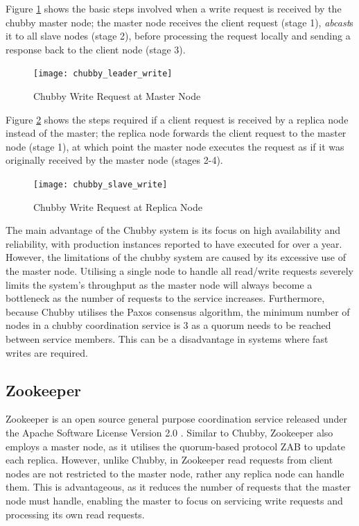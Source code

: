Figure \ref{fig:chubby_leader_write} shows the basic steps involved when a write request is received by the chubby master node; the master node receives the client request (stage 1), \emph{abcast}s it to all slave nodes (stage 2), before processing the request locally and sending a response back to the client node (stage 3).  

	\begin{figure}[htbp!] 
	    \centering    
	    \texttt{[image: chubby\_leader\_write]}
	    \caption[Chubby Write Request at Master Node]{Chubby Write Request at Master Node}
	    \label{fig:chubby_leader_write}
	\end{figure}	 

Figure \ref{fig:chubby_slave_write} shows the steps required if a client request is received by a replica node instead of the master; the replica node forwards the client request to the master node (stage 1), at which point the master node executes the request as if it was originally received by the master node (stages 2-4).

	\begin{figure}[htbp!] 
	    \centering    
	    \texttt{[image: chubby\_slave\_write]}
	    \caption[Chubby Write Request at Replica Node]{Chubby Write Request at Replica Node}
	    \label{fig:chubby_slave_write}
	\end{figure}	 

The main advantage of the Chubby system is its focus on high availability and reliability, with production instances reported to have executed for over a year. However, the limitations of the chubby system are caused by its excessive use of the master node. Utilising a single node to handle all read/write requests severely limits the system's throughput as the master node will always become a bottleneck as the number of requests to the service increases.  Furthermore, because Chubby utilises the Paxos consensus algorithm, the minimum number of nodes in a chubby coordination service is 3 as a quorum needs to be reached between service members.  This can be a disadvantage in systems where fast writes are required.  
	
	\subsection{Zookeeper}
	Zookeeper\citep{Hunt:2010:ZWC:1855840.1855851} is an open source general purpose coordination service released under the Apache Software License Version 2.0 \citep{ApacheLicense}. Similar to Chubby, Zookeeper also employs a master node, as it utilises the quorum-based protocol ZAB\citep{Junqueira:2011:ZHB:2056308.2056409} to update each replica.  However, unlike Chubby, in Zookeeper read requests from client nodes are not restricted to the master node, rather any replica node can handle them.  This is advantageous, as it reduces the number of requests that the master node must handle, enabling the master to focus on servicing write requests and processing its own read requests.  
	
